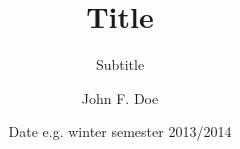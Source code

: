 \documentclass[
paper=a4,
titlepage=true,
fontsize=12pt,
]{scrartcl}
\institute{Institute}
\date{Date e.g. winter semester 2013/2014}
\title{Title}
\subtitle{Subtitle}
\author{John F. Doe}
\begin{document}
\maketitle[]
\end{document}
